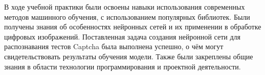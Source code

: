 \documentclass[../document.tex]{subfiles}
\begin{document}
\par В ходе учебной практики были освоены навыки использования современных методов машинного обучения, с использованием популярных библиотек. Были получены знания об особенностях нейронных сетей и их применении в обработке цифровых изображений. Поставленная задача создания нейронной сети для распознавания тестов Captcha была выполнена успешно, о чём могут свидетельствовать результаты обучения модели. Также были закреплены общие знания в области технологии программирования и проектной деятельности.
\end{document}
